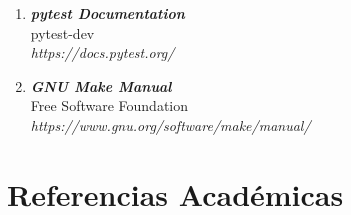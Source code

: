 \begin{enumerate}
    \item \textbf{\textit{pytest Documentation}}\\
    pytest-dev \\
    \textit{https://docs.pytest.org/}

    \item \textbf{\textit{GNU Make Manual}}\\
    Free Software Foundation \\
    \textit{https://www.gnu.org/software/make/manual/}

\end{enumerate}

\section{Referencias Académicas}

